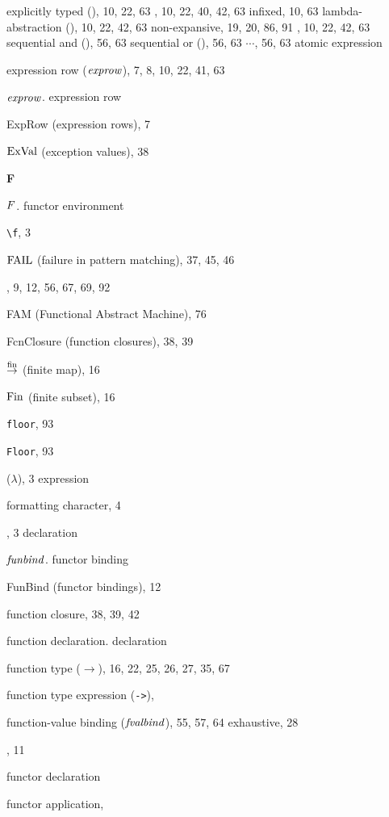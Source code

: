 \begin{theindex}
\subitem explicitly typed (\boxml{:}),  10, 22, 63
\subitem {}, 10, 22, 40, 42, 63
\subitem infixed, 10, 63
\subitem lambda-abstraction (), 10, 22, 42, 63
\subitem non-expansive, 19, 20, 86, 91
\subitem {}, 10, 22, 42, 63
\subitem sequential and (), 56, 63
\subitem sequential or (), 56, 63
\subitem {}$\cdots$, 56, 63
\subitem \seealso atomic expression
\item expression row (${\it exprow}$), 7, 8, 10, 22, 41, 63
\item ${\it exprow}$. \see expression row
\item ExpRow (expression rows), 7
\item ${\rm ExVal}$ (exception values), 38
\indexspace
\parbox{65mm}{\hfil{\large\bf F}\hfil}
\indexspace
\item $F$. \see functor environment
\item \verb+\f+, 3
\item ${\rm FAIL}$ (failure in pattern matching), 37, 45, 46
\item \FALSE, 9, 12, 56, 67, 69, 92
\item FAM (Functional Abstract Machine), 76
\item FcnClosure (function closures), 38, 39
\item $\stackrel{{\rm fin}}{\to}$ (finite map), 16
\item $\mathop{\rm Fin}\nolimits$ (finite subset), 16
\item {\tt floor}, 93
\item {\tt Floor}, 93
\item \FN ($\lambda$), 3
\subitem \seealso expression
\item formatting character, 4
\item \FUN, 3
\subitem \seealso declaration
\item ${\it funbind}$. \see functor binding
\item FunBind (functor bindings), 12
\item function closure, 38, 39, 42
\item function declaration. \see declaration
\item function type ($\rightarrow$), 16, 22, 25, 26, 27, 35, 67
\item function type expression (\verb+->+), \funtyperefs
\item function-value binding (${\it fvalbind}$), 55, 57, 64
\subitem exhaustive, 28
\item \FUNCTOR, 11
\item \seealso functor declaration
\item functor application, \funcapprefs

\end{theindex}
